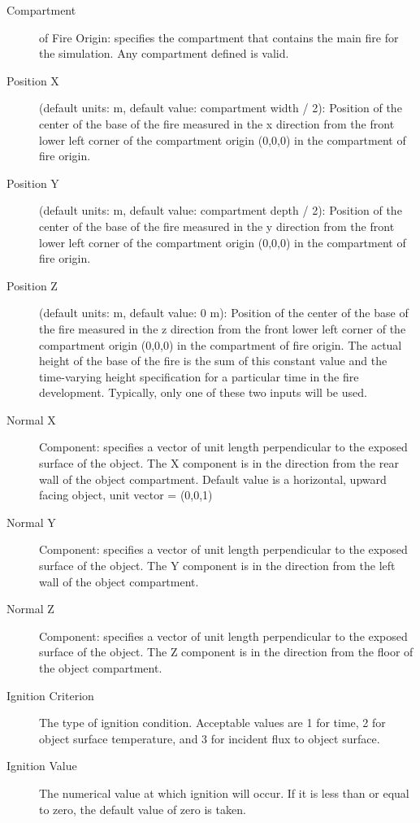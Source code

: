 \begin{description}
\item[Compartment] of Fire Origin: specifies the compartment that contains the main fire for the simulation.  Any compartment defined is valid.

\item[Position X] (default units: m, default value: compartment width / 2): Position of the center of the base of the fire measured in the x direction from the front lower left corner of the compartment origin (0,0,0) in the compartment of fire origin.

\item[Position Y] (default units: m, default value: compartment depth / 2): Position of the center of the base of the fire measured in the y direction from the front lower left corner of the compartment origin (0,0,0) in the compartment of fire origin.

\item[Position Z] (default units: m, default value: 0 m): Position of the center of the base of the fire measured in the z direction from the front lower left corner of the compartment origin (0,0,0) in the compartment of fire origin. The actual height of the base of the fire is the sum of this constant value and the time-varying height specification for a particular time in the fire development. Typically, only one of these two inputs will be used.

\item[Normal  X] Component: specifies a vector of unit length perpendicular to the exposed surface of the object. The X component is in the direction from the rear wall of the object compartment. Default value is a horizontal, upward facing object, unit vector = (0,0,1)

\item[Normal  Y] Component: specifies a vector of unit length perpendicular to the exposed surface of the object. The Y component is in the direction from the left wall of the object compartment. 

\item[Normal  Z] Component: specifies a vector of unit length perpendicular to the exposed surface of the object. The Z component is in the direction from the floor of the object compartment. 

\item[Ignition Criterion] The type of ignition condition. Acceptable values are 1 for time, 2 for object surface temperature, and 3 for incident flux to object surface.

\item[Ignition Value] The numerical value at which ignition will occur. If it is less than or equal to zero, the default value of zero is taken.
\end{description}

